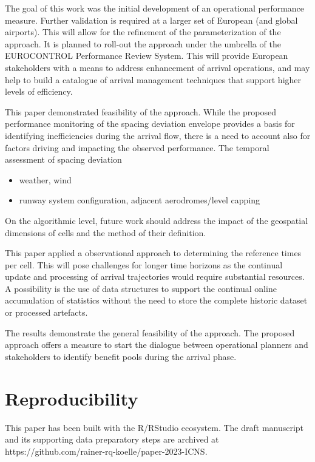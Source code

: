 \documentclass[letterpaper, 10 pt, journal, twoside]{IEEEtran}
\providecommand{\tightlist}{%
  \setlength{\itemsep}{0pt}\setlength{\parskip}{0pt}}\usepackage{longtable,booktabs,array}
\begin{document}
The goal of this work was the initial development of an operational
performance measure. Further validation is required at a larger set of
European (and global airports). This will allow for the refinement of
the parameterization of the approach. It is planned to roll-out the
approach under the umbrella of the EUROCONTROL Performance Review
System. This will provide European stakeholders with a means to address
enhancement of arrival operations, and may help to build a catalogue of
arrival management techniques that support higher levels of efficiency.

This paper demonstrated feasibility of the approach. While the proposed
performance monitoring of the spacing deviation envelope provides a
basis for identifying inefficiencies during the arrival flow, there is a
need to account also for factors driving and impacting the observed
performance. The temporal assessment of spacing deviation

\begin{itemize}
\tightlist
\item
  weather, wind
\item
  runway system configuration, adjacent aerodromes/level capping
\end{itemize}

On the algorithmic level, future work should address the impact of the
geospatial dimensions of cells and the method of their definition.

This paper applied a observational approach to determining the reference
times per cell. This will pose challenges for longer time horizons as
the continual update and processing of arrival trajectories would
require substantial resources. A possibility is the use of data
structures to support the continual online accumulation of statistics
without the need to store the complete historic dataset or processed
artefacts.

The results demonstrate the general feasibility of the approach. The
proposed approach offers a measure to start the dialogue between
operational planners and stakeholders to identify benefit pools during
the arrival phase.

\hypertarget{reproducibility}{%
\section*{Reproducibility}\label{reproducibility}}

This paper has been built with the R/RStudio ecosystem. The draft
manuscript and its supporting data preparatory steps are archived at
https://github.com/rainer-rq-koelle/paper-2023-ICNS.
\end{document}
